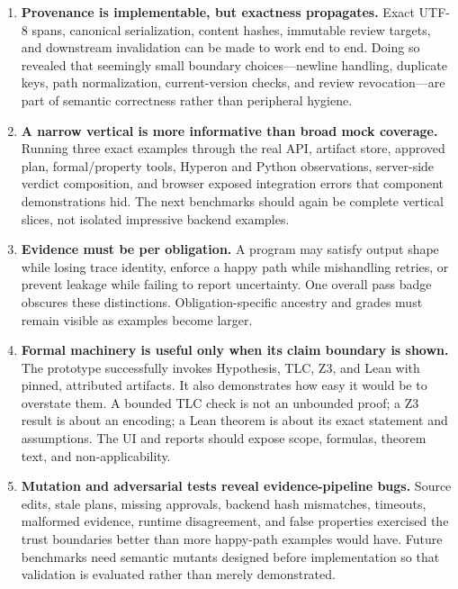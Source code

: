 \documentclass[11pt]{article}
\begin{document}
\begin{enumerate}
\item \textbf{Provenance is implementable, but exactness propagates.}
Exact UTF-8 spans, canonical serialization, content hashes, immutable review
targets, and downstream invalidation can be made to work end to end.  Doing so
revealed that seemingly small boundary choices---newline handling, duplicate
keys, path normalization, current-version checks, and review revocation---are
part of semantic correctness rather than peripheral hygiene.

\item \textbf{A narrow vertical is more informative than broad mock
coverage.}  Running three exact examples through the real API, artifact
store, approved plan, formal/property tools, Hyperon and Python observations,
server-side verdict composition, and browser exposed integration errors that
component demonstrations hid.  The next benchmarks should again be complete
vertical slices, not isolated impressive backend examples.

\item \textbf{Evidence must be per obligation.}  A program may satisfy output
shape while losing trace identity, enforce a happy path while mishandling
retries, or prevent leakage while failing to report uncertainty.  One overall
pass badge obscures these distinctions.  Obligation-specific ancestry and
grades must remain visible as examples become larger.

\item \textbf{Formal machinery is useful only when its claim boundary is
shown.}  The prototype successfully invokes Hypothesis, TLC, Z3, and Lean with
pinned, attributed artifacts.  It also demonstrates how easy it would be to
overstate them.  A bounded TLC check is not an unbounded proof; a Z3 result is
about an encoding; a Lean theorem is about its exact statement and
assumptions.  The UI and reports should expose scope, formulas, theorem text,
and non-applicability.

\item \textbf{Mutation and adversarial tests reveal evidence-pipeline bugs.}
Source edits, stale plans, missing approvals, backend hash mismatches, timeouts,
malformed evidence, runtime disagreement, and false properties exercised the
trust boundaries better than more happy-path examples would have.  Future
benchmarks need semantic mutants designed before implementation so that
validation is evaluated rather than merely demonstrated.


\end{enumerate}
\end{document}
